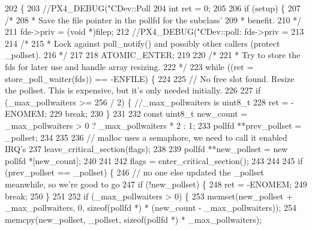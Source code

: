 \begin{DoxyCode}
202 \{
203     \textcolor{comment}{//PX4\_DEBUG("CDev::Poll %
204     \textcolor{keywordtype}{int} ret = 0;
205 
206     \textcolor{keywordflow}{if} (setup) \{
207         \textcolor{comment}{/*}
208 \textcolor{comment}{         * Save the file pointer in the pollfd for the subclass'}
209 \textcolor{comment}{         * benefit.}
210 \textcolor{comment}{         */}
211         fds->priv = (\textcolor{keywordtype}{void} *)filep;
212         \textcolor{comment}{//PX4\_DEBUG("CDev::poll: fds->priv = %
213 
214         \textcolor{comment}{/*}
215 \textcolor{comment}{         * Lock against poll\_notify() and possibly other callers (protect \_pollset).}
216 \textcolor{comment}{         */}
217         
218         ATOMIC\_ENTER;
219 
220         \textcolor{comment}{/*}
221 \textcolor{comment}{         * Try to store the fds for later use and handle array resizing.}
222 \textcolor{comment}{         */}
223         \textcolor{keywordflow}{while} ((ret = store\_poll\_waiter(fds)) == -ENFILE) \{
224 
225             \textcolor{comment}{// No free slot found. Resize the pollset. This is expensive, but it's only needed initially.}
226 
227             \textcolor{keywordflow}{if} (\_max\_pollwaiters >= 256 / 2) \{ \textcolor{comment}{//\_max\_pollwaiters is uint8\_t}
228                 ret = -ENOMEM;
229                 \textcolor{keywordflow}{break};
230             \}
231 
232             \textcolor{keyword}{const} uint8\_t new\_count = \_max\_pollwaiters > 0 ? \_max\_pollwaiters * 2 : 1;
233             pollfd **prev\_pollset = \_pollset;
234 
235 
236             \textcolor{comment}{// malloc uses a semaphore, we need to call it enabled IRQ's}
237             leave\_critical\_section(flags);
238 
239             pollfd **new\_pollset = \textcolor{keyword}{new} pollfd *[new\_count];
240 
241 
242             flags = enter\_critical\_section();
243 
244 
245             \textcolor{keywordflow}{if} (prev\_pollset == \_pollset) \{
246                 \textcolor{comment}{// no one else updated the \_pollset meanwhile, so we're good to go}
247                 \textcolor{keywordflow}{if} (!new\_pollset) \{
248                     ret = -ENOMEM;
249                     \textcolor{keywordflow}{break};
250                 \}
251 
252                 \textcolor{keywordflow}{if} (\_max\_pollwaiters > 0) \{
253                     memset(new\_pollset + \_max\_pollwaiters, 0, \textcolor{keyword}{sizeof}(pollfd *) * (new\_count - 
      \_max\_pollwaiters));
254                     memcpy(new\_pollset, \_pollset, \textcolor{keyword}{sizeof}(pollfd *) * \_max\_pollwaiters);
}}
\end{DoxyCode}
